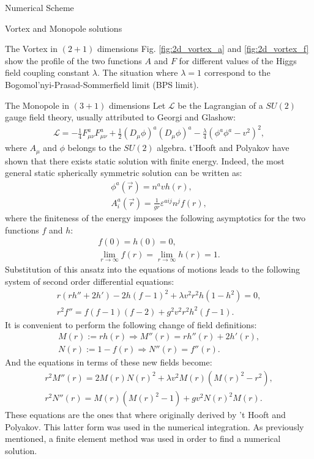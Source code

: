 \begin{section}{Numerical Scheme}
\begin{subsection}{Vortex and Monopole solutions}
\begin{subsubsection}{The Vortex in $(2+1)$ dimensions}
      Fig. \ref{fig:2d_vortex_a} and \ref{fig:2d_vortex_f} show the
      profile of the two functions $A$ and $F$ for different values of
      the Higgs field coupling constant $\lambda$. The situation where
      $\lambda = 1$ correspond to the Bogomol'nyi-Prasad-Sommerfield
      limit (BPS limit).
    \end{subsubsection}
    \begin{subsubsection}{The Monopole in $(3+1)$ dimensions}\label{sec:theory_monopole}
      Let $\mathcal L$ be the Lagrangian of a $SU(2)$ gauge field
      theory, usually attributed to Georgi and Glashow:
      \begin{align}
        \mathcal L = -\frac{1}{4}F_{\mu\nu}^aF_{\mu\nu}^a+\frac{1}{2}(D_\mu\phi)^a(D_\mu\phi)^a-\frac{\lambda}{4}(\phi^a\phi^a-v^2)^2,
      \end{align}
      where $A_\mu$ and $\phi$ belongs to the $SU(2)$ algebra. t'Hooft
      and Polyakov have shown that there exists static solution with
      finite energy. Indeed, the most general static
      spherically symmetric solution can be written as:
      \begin{align}
        \phi^a(\vec r) = n^a v h(r),\\
        A_i^a(\vec r) = \frac{1}{gr}\varepsilon^{aij}n^jf(r),
      \end{align}
      where the finiteness of the energy imposes the following
      asymptotics for the two functions $f$ and $h$:
      \begin{align}
        f(0) = h(0) = 0,\\
        \lim_{r\to\infty} f(r) = \lim_{r\to\infty} h(r) = 1.
      \end{align}
      Substitution of this ansatz into the equations of motions leads
      to the following system of second order differential equations:
      \begin{align}
        r(rh''+2h')-2h(f-1)^2+\lambda v^2r^2h(1-h^2) = 0,\\
        r^2f'' = f(f-1)(f-2)+g^2 v^2 r^2 h^2(f-1).
      \end{align}
      It is convenient to perform the following change of field definitions:
      \begin{align}
        M(r):=rh(r)\Rightarrow M''(r)=rh''(r)+2h'(r),\\
        N(r):=1-f(r)\Rightarrow N''(r)=f''(r).
      \end{align}
      And the equations in terms of these new fields become:
      \begin{align}
        r^2M''(r)=2M(r)N(r)^2+\lambda v^2 M(r)(M(r)^2-r^2),\\
        r^2N''(r)=M(r)(M(r)^2-1)+gv^2N(r)^2M(r).
      \end{align}
      These equations are the ones that where originally derived by 't
      Hooft and Polyakov. This latter form was used in the numerical
      integration. As previously mentioned, a finite element method
      was used in order to find a numerical solution.


\end{subsubsection}
\end{subsection}
\end{section}
